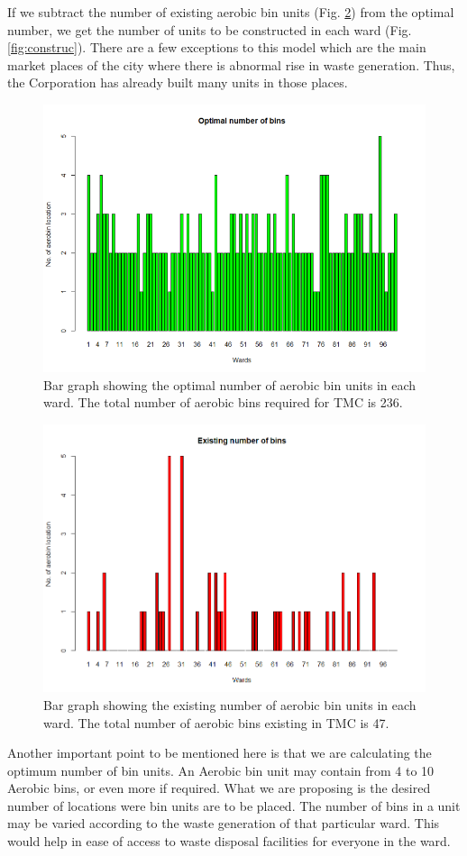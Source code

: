 \documentclass[12pt,a4paper]{report}
\begin{document}
If we subtract the number of existing aerobic bin units (Fig. \ref{fig:exis}) from the optimal number, we get the number of units to be constructed in each ward (Fig. \ref{fig:construc}). There are a few exceptions to this model which are the main market places of the city where there is abnormal rise in waste generation. Thus, the Corporation has already built many units in those places.

\begin{figure}[H]
	\centering
	\includegraphics[width=0.7\linewidth]{optimal}
	\caption{Bar graph showing the optimal number of aerobic bin units in each ward. The total number of aerobic bins required for TMC is 236.}
	\label{fig:optimal}
\end{figure}
	
\begin{figure}[H]
	\centering
	\includegraphics[width=0.7\linewidth]{exis}
	\caption{Bar graph showing the existing number of aerobic bin units in each ward. The total number of aerobic bins existing in TMC is 47.}
	\label{fig:exis}
\end{figure}

Another important point to be mentioned here is that we are calculating the optimum number of bin units. An Aerobic bin unit may contain from 4 to 10 Aerobic bins, or even more if required. What we are proposing is the desired number of locations were bin units are to be placed. The number of bins in a unit may be varied according to the waste generation of that particular ward. This would help in ease of access to waste disposal facilities for everyone in the ward.
\end{document}

